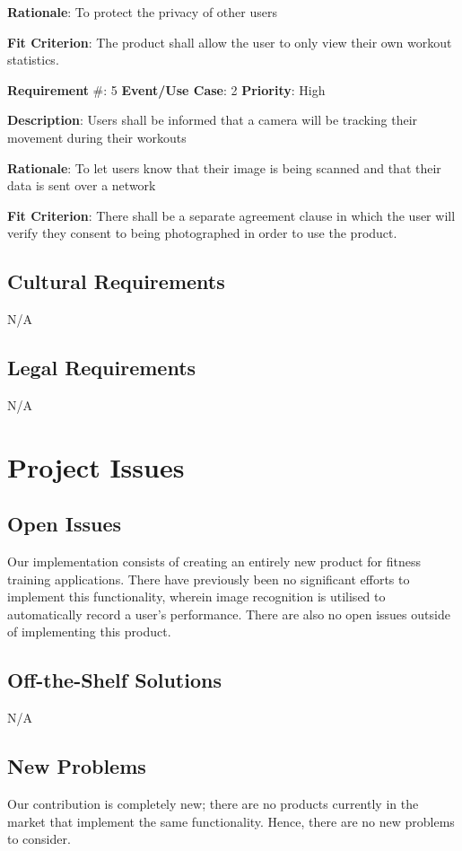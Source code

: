 \documentclass{article}
\newcommand\tab{\hspace*{2cm}}
\begin{document}
\textbf{Rationale}: To protect the privacy of other users

\textbf{Fit Criterion}: The product shall allow the user to only view their own workout statistics.

\medskip

\textbf{Requirement} \#: 5 \tab \textbf{Event/Use Case}: 2 \tab \textbf{Priority}: High

\textbf{Description}: Users shall be informed that a camera will be tracking their movement during their workouts

\textbf{Rationale}: To let users know that their image is being scanned and that their data is sent over a network

\textbf{Fit Criterion}: There shall be a separate agreement clause in which the user will verify they consent to being photographed in order to use the product.

\medskip

\subsection{Cultural Requirements}
N/A
\subsection{Legal Requirements}
N/A

\newpage
\section{Project Issues}
\subsection{Open Issues}
Our implementation consists of creating an entirely new product for fitness training applications. There have previously been no significant efforts to implement this functionality, wherein image recognition is utilised to automatically record a user's performance. There are also no open issues outside of implementing this product.

\subsection{Off-the-Shelf Solutions}
N/A

\subsection{New Problems}
Our contribution is completely new; there are no products currently in the market that implement the same functionality. Hence, there are no new problems to consider. 
\end{document}
